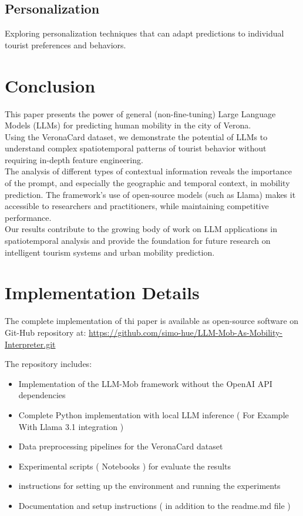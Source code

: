 \documentclass[12pt,a4paper]{article}
\begin{document}
\subsection{Personalization}
Exploring personalization techniques that can adapt predictions to individual tourist preferences and behaviors.

\section{Conclusion}

This paper presents the power of general (non-fine-tuning) Large Language Models (LLMs) for predicting human mobility in the city of Verona.\\
Using the VeronaCard dataset, we demonstrate the potential of LLMs to understand complex spatiotemporal patterns of tourist behavior without requiring in-depth feature engineering.\\

The analysis of different types of contextual information reveals the importance of the prompt, and especially the geographic and temporal context, in mobility prediction. The framework's use of open-source models (such as Llama) makes it accessible to researchers and practitioners, while maintaining competitive performance.\\

Our results contribute to the growing body of work on LLM applications in spatiotemporal analysis and provide the foundation for future research on intelligent tourism systems and urban mobility prediction.\\

\section{Implementation Details}

The complete implementation of thi paper is available as open-source software on Git-Hub repository at:
\url{https://github.com/simo-hue/LLM-Mob-As-Mobility-Interpreter.git}

The repository includes:
\begin{itemize}
\item Implementation of the LLM-Mob framework without the OpenAI API dependencies    
\item Complete Python implementation with local LLM inference ( For Example With Llama 3.1 integration )
\item Data preprocessing pipelines for the VeronaCard dataset
\item Experimental scripts ( Notebooks ) for evaluate the results
\item instructions for setting up the environment and running the experiments
\item Documentation and setup instructions ( in addition to the readme.md file )
\end{itemize}
\end{document}

